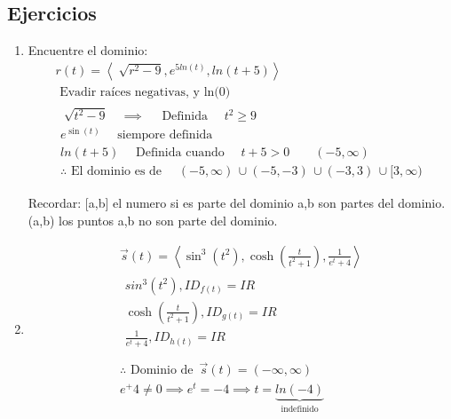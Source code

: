 \documentclass{article}
\begin{document}
\subsection{Ejercicios}
\begin{enumerate}
    \item Encuentre el dominio:
        \begin{align*}
            r(t) = \left\langle \sqrt[]{r^2-9}, e^{5ln(t)}, ln(t+5) \right\rangle \\ 
            \text{  Evadir raíces negativas, y ln(0)  } \\ 
            \begin{matrix}
                \sqrt[]{t^2-9} \quad \implies \quad \text{  Definida   } \quad t^2 \geq 9 \\ 
                e^{\sin(t)} \quad \text{  siempore definida  } \\ 
                ln(t+5) \quad \text{  Definida cuando   } \quad t +5 > 0 \quad \quad (-5, \infty ) \\ 
                \therefore \text{  El dominio es de   } \quad (-5,\infty ) \, \cup (-5,-3) \, \cup (-3,3) \, \cup [3,\infty ) \\ 
            \end{matrix} \\ 
        \end{align*}
        Recordar: [a,b] el numero si es parte del dominio a,b son partes del dominio. (a,b) los puntos a,b no son parte del dominio.
    
    \item \begin{align*}
        \vec{s}(t) = \left\langle \sin^3(t^2), \cosh(\frac{t}{t^2+1} ), \frac{1}{e^t+4}  \right\rangle \\ 
        \begin{matrix}
            sin^3(t^2), ID_{f(t)} = IR \\ 
            \cosh(\frac{t}{t^2+1} ), ID_{g(t)} = IR \\ 
            \frac{1}{e^t+4}, ID_{h(t)} = IR \\ 
        \end{matrix} \\ 
        \therefore \text{  Dominio de   } \, \vec{s}(t) = (-\infty ,\infty ) \\ 
        e^+4\neq 0 \implies e^t=-4 \implies t = \underbrace{ln(-4)}_{\text{  indefinido  }} \\ 
    \end{align*}
\end{enumerate}
\end{document}
